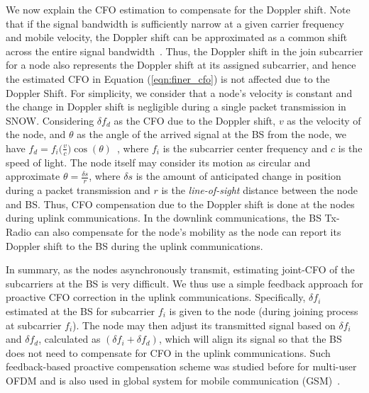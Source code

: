 We now explain the CFO estimation to compensate for the Doppler shift. Note that if the signal bandwidth is sufficiently narrow at a given carrier frequency and mobile velocity, the Doppler shift can be approximated as a common shift across the entire signal bandwidth~\cite{talbot2007mobility}. Thus, the Doppler shift in the join subcarrier for a node also represents the Doppler shift at its assigned subcarrier, and hence the estimated CFO in Equation (\ref{eqn:finer_cfo}) is not affected due to the Doppler Shift.
For simplicity, we consider that a node's velocity is constant and the change in Doppler shift is negligible during a single packet transmission in SNOW.
Considering $\delta f_d$ as the CFO due to the Doppler shift, $v$ as the velocity of the node, and $\theta$ as the angle of the arrived signal at the BS from the node, we have $f_d = f_i\big(\frac{v}{c}\big)\cos(\theta)$~\cite{talbot2007mobility}, where
$f_i$ is the subcarrier center frequency and $c$ is the speed of light. The node itself may consider its motion as circular and approximate $\theta = \frac{\delta s}{r}$, where $\delta s$ is the amount of anticipated change in position during a packet transmission and $r$ is the {\em line-of-sight} distance between the node and BS. Thus, CFO compensation due to the Doppler shift is done at the nodes during uplink communications. In the downlink communications, the BS Tx-Radio can also compensate for the node's mobility as the node can report its Doppler shift to the BS during the uplink communications.

In summary, as the nodes asynchronously transmit, estimating joint-CFO of the subcarriers at the BS is very difficult. We thus use a simple feedback approach for proactive CFO correction in the uplink communications. Specifically, 
$\delta f_i$  estimated at the BS for subcarrier $f_i$ is given to the node (during joining process at subcarrier $f_i$).
The node may then adjust its transmitted signal based on $\delta f_i$ and $\delta f_d$, calculated as $(\delta f_i + \delta f_d)$, which will align its signal so that the BS does not need to compensate for CFO in the uplink communications. Such feedback-based proactive compensation scheme was studied before for multi-user OFDM and is also used in global system for mobile communication (GSM)~\cite{van1999time}.

